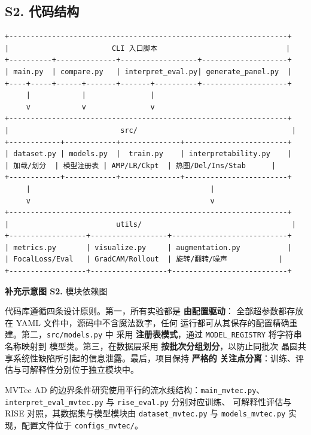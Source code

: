 \documentclass[11pt,a4paper]{article}
\begin{document}
\clearpage
{}
\subsection*{S2. 代码结构}

\begin{Verbatim}
+-----------------------------------------------------------------+
|                        CLI 入口脚本                              |
+----------+--------------+------------------+--------------------+
| main.py  | compare.py   | interpret_eval.py| generate_panel.py  |
+----+-----+------+-------+-------+----------+--------------------+
     |            |               |
     v            v               v
+-----------------------------------------------------------------+
|                          src/                                    |
+------------+------------+--------------+------------------------+
| dataset.py | models.py  |  train.py    | interpretability.py    |
| 加载/划分  | 模型注册表 | AMP/LR/Ckpt  | 热图/Del/Ins/Stab      |
+------------+------------+--------------+------------------------+
     |                                          |
     v                                          v
+-----------------------------------------------------------------+
|                         utils/                                   |
+------------------+------------------+---------------------------+
| metrics.py       | visualize.py     | augmentation.py           |
| FocalLoss/Eval   | GradCAM/Rollout  | 旋转/翻转/噪声            |
+------------------+------------------+---------------------------+
\end{Verbatim}

\begin{center}
\small \textbf{补充示意图 S2.} 模块依赖图
\end{center}

代码库遵循四条设计原则。第一，所有实验都是 \textbf{由配置驱动}： 全部超参数都存放在 YAML 文件中，源码中不含魔法数字，任何 运行都可从其保存的配置精确重建。第二，\texttt{src/models.py} 中 采用 \textbf{注册表模式}，通过 \texttt{MODEL\_REGISTRY} 将字符串名称映射到 模型类。第三，在数据层采用 \textbf{按批次分组划分}，以防止同批次 晶圆共享系统性缺陷所引起的信息泄露。最后，项目保持 \textbf{严格的 关注点分离}：训练、评估与可解释性分别位于独立模块中。

MVTec AD 的边界条件研究使用平行的流水线结构：\texttt{main\_mvtec.py}、 \texttt{interpret\_eval\_mvtec.py} 与 \texttt{rise\_eval.py} 分别对应训练、 可解释性评估与 RISE 对照，其数据集与模型模块由 \texttt{dataset\_mvtec.py} 与 \texttt{models\_mvtec.py} 实现，配置文件位于 \texttt{configs\_mvtec/}。
\end{document}
